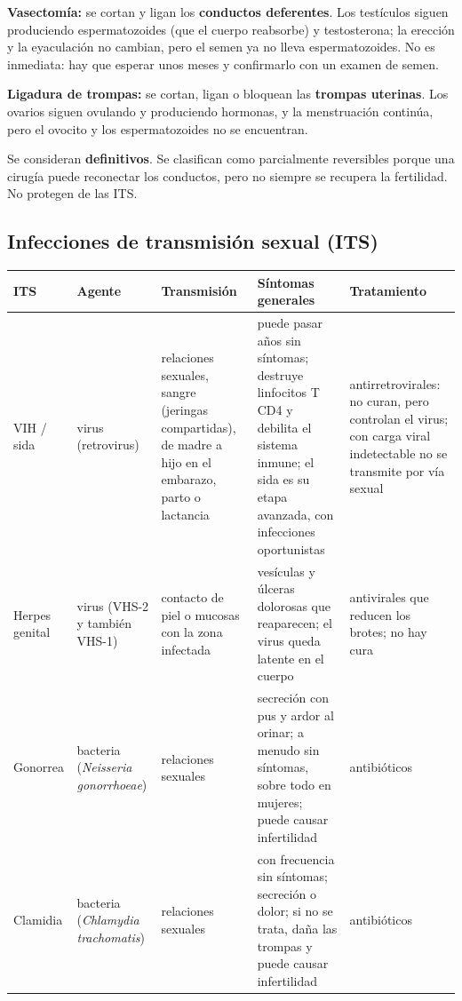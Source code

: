 \textbf{Vasectomía:} se cortan y ligan los \textbf{conductos deferentes}. Los testículos siguen produciendo espermatozoides (que el cuerpo reabsorbe) y testosterona; la erección y la eyaculación no cambian, pero el semen ya no lleva espermatozoides. No es inmediata: hay que esperar unos meses y confirmarlo con un examen de semen.

  

\textbf{Ligadura de trompas:} se cortan, ligan o bloquean las \textbf{trompas uterinas}. Los ovarios siguen ovulando y produciendo hormonas, y la menstruación continúa, pero el ovocito y los espermatozoides no se encuentran.

 
\begin{clave}[{Recuerda}] Se consideran \textbf{definitivos}. Se clasifican como parcialmente reversibles porque una cirugía puede reconectar los conductos, pero no siempre se recupera la fertilidad. No protegen de las ITS.\end{clave}
\subsection{Infecciones de transmisión sexual (ITS)}
\begin{center}\small
\begin{tabularx}{\linewidth}{@{}>{\raggedright\arraybackslash\hsize=0.42\hsize}X>{\raggedright\arraybackslash\hsize=0.96\hsize}X>{\raggedright\arraybackslash\hsize=1.20\hsize}X>{\raggedright\arraybackslash\hsize=1.20\hsize}X>{\raggedright\arraybackslash\hsize=1.20\hsize}X@{}}
\toprule
\textbf{ITS} & \textbf{Agente} & \textbf{Transmisión} & \textbf{Síntomas generales} & \textbf{Tratamiento} \\
\midrule
VIH / sida & virus (retrovirus) & relaciones sexuales, sangre (jeringas compartidas), de madre a hijo en el embarazo, parto o lactancia & puede pasar años sin síntomas; destruye linfocitos T CD4 y debilita el sistema inmune; el sida es su etapa avanzada, con infecciones oportunistas & antirretrovirales: no curan, pero controlan el virus; con carga viral indetectable no se transmite por vía sexual \\
Herpes genital & virus (VHS-2 y también VHS-1) & contacto de piel o mucosas con la zona infectada & vesículas y úlceras dolorosas que reaparecen; el virus queda latente en el cuerpo & antivirales que reducen los brotes; no hay cura \\
Gonorrea & bacteria (\emph{Neisseria gonorrhoeae}) & relaciones sexuales & secreción con pus y ardor al orinar; a menudo sin síntomas, sobre todo en mujeres; puede causar infertilidad & antibióticos \\
Clamidia & bacteria (\emph{Chlamydia trachomatis}) & relaciones sexuales & con frecuencia sin síntomas; secreción o dolor; si no se trata, daña las trompas y puede causar infertilidad & antibióticos \\
\bottomrule
\end{tabularx}
\end{center}
 
